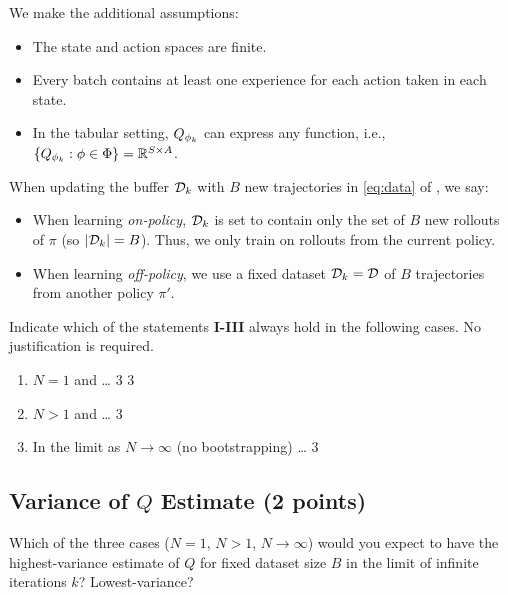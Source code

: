 We make the additional assumptions: 
\begin{itemize}
	\item The state and action spaces are finite.
	\item Every batch contains at least one experience for each action taken in each state.
	\item In the tabular setting, $Q_{\phi_k}$ can express any function, i.e., $\{Q_{\phi_k}:\phi\in\Phi\}=\mathbb{R}^{S\times A}$.
\end{itemize}
When updating the buffer $\mathcal{D}_k$ with $B$ new trajectories in \cref{eq:data} of , we say:
\begin{itemize}
    \item When learning \textit{on-policy}, $\mathcal{D}_k$ is set to contain only the set of $B$ new rollouts of $\pi$ (so $\lvert \mathcal{D}_k \rvert = B$). Thus, we only train on rollouts from the current policy.
	\item When learning \textit{off-policy}, we use a fixed dataset $\mathcal{D}_k=\mathcal{D}$ of $B$ trajectories from another policy $\pi'$. 
\end{itemize}

Indicate which of the statements \textbf{I-III} always hold in the following cases. No justification is required.
\ifsolutions\solve\thesubsection\else
\begin{enumerate}
\item $N=1$ and \ldots \makecols\ncol\heading\choices
	{3} %
	{3} %
\item $N>1$ and \ldots \choices
	{3} %
	{} %
\item In the limit as $N\to\infty$ (no bootstrapping) \ldots \choices
	{3} %
	{} %
\end{enumerate}
\fi

\subsection{Variance of $Q$ Estimate (2 points)}
\label{q:variance_estimate}
Which of the three cases ($N = 1$, $N > 1$, $N \to \infty$) would you expect to have the highest-variance estimate of $Q$ for fixed dataset size $B$ in the limit of infinite iterations $k$? Lowest-variance?

